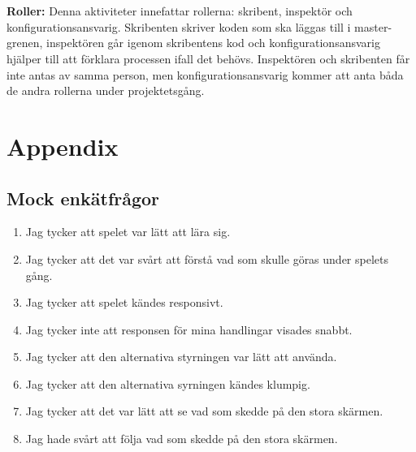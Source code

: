 \documentclass[10pt]{article}
\begin{document}
	\\\\
	\textbf{Roller:} Denna aktiviteter innefattar rollerna: skribent, inspektör och konfigurationsansvarig. Skribenten skriver koden som ska läggas till i master-grenen, inspektören går igenom skribentens kod och konfigurationsansvarig hjälper till att förklara processen ifall det behövs. Inspektören och skribenten får inte antas av samma person, men konfigurationsansvarig kommer att anta båda de andra rollerna under projektetsgång.
	
	
\pagebreak
\section*{Appendix}
	\subsection*{Mock enkätfrågor}
	\begin{enumerate}
		\item Jag tycker att spelet var lätt att lära sig. 
		\item Jag tycker att det var svårt att förstå vad som skulle göras under spelets gång.
		\item Jag tycker att spelet kändes responsivt.
		\item Jag tycker inte att responsen för mina handlingar visades snabbt.
		\item Jag tycker att den alternativa styrningen var lätt att använda.
		\item Jag tycker att den alternativa syrningen kändes klumpig.
		\item Jag tycker att det var lätt att se vad som skedde på den stora skärmen.
		\item Jag hade svårt att följa vad som skedde på den stora skärmen.
		
	\end{enumerate}




	
\pagebreak

\printbibliography
{}
\end{document}
